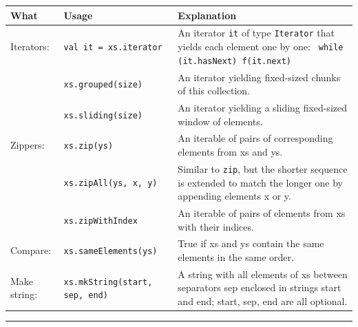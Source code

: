 \documentclass[article, a5paper]{memoir}
\newcommand{\LangColor}{red}
\newcommand{\head}[1]{{\bfseries {\color{\LangColor}{#1}}\par\vspace{1mm}\hrule\vspace{-2mm}}}
\renewcommand{\arraystretch}{0.9}
\newcommand{\Newline}{\vspace{\baselineskip}}
\begin{document}
{\small\renewcommand{\arraystretch}{1.1}
\begin{tabular}{@{}l p{3.4cm} p{6.8cm}}

\textbf{What} & \textbf{Usage} & \textbf{Explanation} \\ \hline

  Iterators: & \texttt{val it = xs.iterator} & An iterator \texttt{it} of type \texttt{Iterator} that yields each element one by one: \texttt{ while (it.hasNext) f(it.next)}\\   \cline{2-3}

   & \texttt{xs.grouped(size)} & An iterator yielding fixed-sized chunks of this collection.\\\cline{2-3}
   & \texttt{xs.sliding(size)} & An iterator yielding a sliding fixed-sized window of elements.\\\cline{1-3}

  Zippers: & \texttt{xs.zip(ys)} &  	An iterable of pairs of corresponding elements from xs and ys.\\   \cline{2-3}
   & \texttt{xs.zipAll(ys, x, y)} & Similar to \texttt{zip}, but the shorter sequence is extended to match the longer one by appending elements x or y.\\\cline{2-3}
   & \texttt{xs.zipWithIndex} & An iterable of pairs of elements from xs with their indices.\\\cline{1-3}

  Compare: & \texttt{xs.sameElements(ys)} & True if xs and ys contain the same elements in the same order.\\   \cline{1-3}

 Make string: & \texttt{xs.mkString(start, sep, end)} & A string with all elements of xs between separators sep enclosed in strings start and end; start, sep, end are all optional.\\ \cline{1-3}



\end{tabular}
}

\Newline
\head{Methods in trait \texttt{Seq[A]}}\Newline
\end{document}
